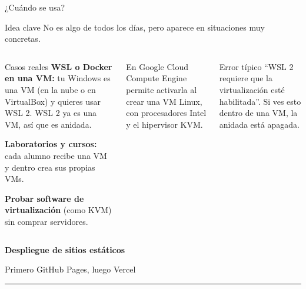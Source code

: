 \documentclass[aspectratio=169,10pt,c]{beamer}
\begin{document}
\begin{frame}{¿Cuándo se usa?}
\begin{block}{Idea clave}
\small No es algo de todos los días, pero aparece en situaciones muy concretas.
\end{block}
\begin{columns}[T,onlytextwidth]
\begin{exampleblock}{Casos reales}
\small
\textbf{WSL o Docker en una VM:} tu Windows es una VM (en la nube o en VirtualBox) y quieres usar WSL 2. WSL 2 ya es una VM, así que es anidada.\par\smallskip
\textbf{Laboratorios y cursos:} cada alumno recibe una VM y dentro crea sus propias VMs.\par\smallskip
\textbf{Probar software de virtualización} (como KVM) sin comprar servidores.
\end{exampleblock}
\begin{block}{En Google Cloud}
\small Compute Engine permite activarla al crear una VM Linux, con procesadores Intel y el hipervisor KVM.
\end{block}
\begin{alertblock}{Error típico}
\small ``WSL 2 requiere que la virtualización esté habilitada''. Si ves esto dentro de una VM, la anidada está apagada.
\end{alertblock}
\end{columns}
\end{frame}

\begin{frame}[plain]
\vfill
\begin{center}
{\fontsize{29}{34}\selectfont\bfseries Despliegue de sitios estáticos}\par
\vspace{2mm}
{\small Primero GitHub Pages, luego Vercel}\par
\vspace{4mm}
{\color{utpRojo}\rule{8.5cm}{1.2pt}}
\end{center}
\vfill
\end{frame}
\end{document}

